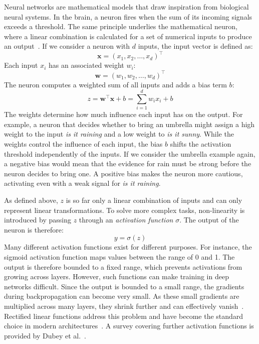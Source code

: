 \documentclass[
12pt,
fancyheadings,
a4paper,
twoside,
BCOR=0.7cm,
nobcorignoretitle,
grayscalebody,
]{stsreprt}
\begin{document}
Neural networks are mathematical models that draw inspiration from biological neural systems.
In the brain, a neuron fires when the sum of its incoming signals exceeds a threshold.
The same principle underlies the mathematical neuron, where a linear combination is calculated for
a set of numerical inputs to produce an output~\cite{rosenblatt1958perceptron}.
If we consider a neuron with $d$ inputs, the input vector is defined as:
\begin{equation}
    \mathbf{x} = (x_1, x_2, \dots, x_d)^\top
\end{equation}
Each input $x_i$ has an associated weight $w_i$:
\begin{equation}
    \mathbf{w} = (w_1, w_2, \dots, w_d)^\top
\end{equation}
The neuron computes a weighted sum of all inputs and adds a bias term $b$:
\begin{equation}
        z = \mathbf{w}^\top \mathbf{x} + b = \sum_{i=1}^{d} w_i x_i + b
\end{equation}
The weights determine how much influence each input has on the output.
For example, a neuron that decides whether to bring an umbrella might assign a high weight to the
input \textit{is it raining} and a low weight to \textit{is it sunny}.
While the weights control the influence of each input, the bias $b$ shifts the activation threshold
independently of the inputs.
If we consider the umbrella example again, a negative bias would mean that the evidence for rain
must be strong before the neuron decides to bring one.
A positive bias makes the neuron more cautious, activating even with a weak signal for \textit{is
it raining}.

As defined above, $z$ is so far only a linear combination of inputs and can only represent linear
transformations.
To solve more complex tasks, non-linearity is introduced by passing $z$ through an
\textit{activation function} $\sigma$.
The output of the neuron is therefore:
\begin{equation}
        y = \sigma(z)
\end{equation}
Many different activation functions exist for different purposes.
For instance, the sigmoid activation function maps values between the range of 0 and 1.
The output is therefore bounded to a fixed range, which prevents activations from growing across
layers.
However, such functions can make training in deep networks difficult.
Since the output is bounded to a small range, the gradients during backpropagation can become very
small.
As these small gradients are multiplied across many layers, they shrink further and can effectively
vanish~\cite{Goodfellow-et-al-2016}.
Rectified linear functions address this problem and have become the standard choice in modern
architectures~\cite{krizhevsky2017imagenet}.
A survey covering further activation functions is provided by Dubey et
al.~\cite{dubey2022activation}.
\end{document}
